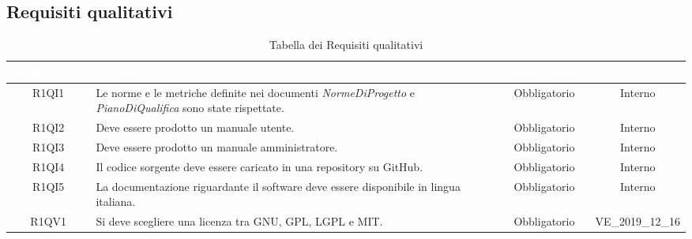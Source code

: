 \subsection{Requisiti qualitativi}
{
\renewcommand{\arraystretch}{1.5}
\centering
\begin{longtable}{ c C{8cm} c c}
\caption{Tabella dei Requisiti qualitativi}\\
\textcolor{white}{\textbf{Identificativo}} & \textcolor{white}{\textbf{Descrizione}} & \textcolor{white}{\textbf{Classificazione}} & \textcolor{white}{\textbf{Fonti}}\\	
\endhead

R1QI1 & Le norme e le metriche definite nei documenti \textit{NormeDiProgetto} e \textit{PianoDiQualifica} sono state rispettate. & Obbligatorio & Interno\\

R1QI2 & Deve essere prodotto un manuale utente. & Obbligatorio & Interno\\

R1QI3 & Deve essere prodotto un manuale amministratore. & Obbligatorio & Interno\\

R1QI4 & Il codice sorgente deve essere caricato in una repository su GitHub. & Obbligatorio & Interno\\

R1QI5 & La documentazione riguardante il software deve essere disponibile in lingua italiana. & Obbligatorio & Interno\\

R1QV1 & Si deve scegliere una licenza tra GNU, GPL, LGPL e MIT. & Obbligatorio & VE\_2019\_12\_16 \\

\end{longtable}
}
